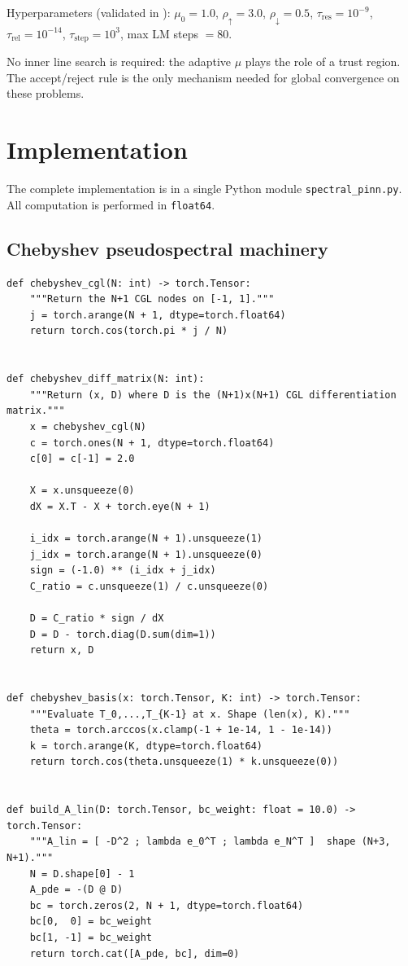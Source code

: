 \documentclass[11pt,a4paper]{article}
\newcommand{\Alin}{A_{\mathrm{lin}}}
\begin{document}
Hyperparameters (validated in ):
$\mu_{0}=1.0$, $\rho_{\uparrow}=3.0$, $\rho_{\downarrow}=0.5$,
$\tau_{\mathrm{res}}=10^{-9}$, $\tau_{\mathrm{rel}}=10^{-14}$,
$\tau_{\mathrm{step}}=10^{3}$, max LM steps $=80$.

No inner line search is required: the adaptive $\mu$ plays the role of a trust
region. The accept/reject rule is the only mechanism needed for global
convergence on these problems.

\section{Implementation}
\label{sec:code}

The complete implementation is in a single Python module \texttt{spectral\_pinn.py}.
All computation is performed in \texttt{float64}.

\subsection{Chebyshev pseudospectral machinery}

\begin{lstlisting}[caption={CGL nodes, differentiation matrix, basis, and $\Alin$.},label={lst:cheb}]
def chebyshev_cgl(N: int) -> torch.Tensor:
    """Return the N+1 CGL nodes on [-1, 1]."""
    j = torch.arange(N + 1, dtype=torch.float64)
    return torch.cos(torch.pi * j / N)


def chebyshev_diff_matrix(N: int):
    """Return (x, D) where D is the (N+1)x(N+1) CGL differentiation matrix."""
    x = chebyshev_cgl(N)
    c = torch.ones(N + 1, dtype=torch.float64)
    c[0] = c[-1] = 2.0

    X = x.unsqueeze(0)
    dX = X.T - X + torch.eye(N + 1)

    i_idx = torch.arange(N + 1).unsqueeze(1)
    j_idx = torch.arange(N + 1).unsqueeze(0)
    sign = (-1.0) ** (i_idx + j_idx)
    C_ratio = c.unsqueeze(1) / c.unsqueeze(0)

    D = C_ratio * sign / dX
    D = D - torch.diag(D.sum(dim=1))
    return x, D


def chebyshev_basis(x: torch.Tensor, K: int) -> torch.Tensor:
    """Evaluate T_0,...,T_{K-1} at x. Shape (len(x), K)."""
    theta = torch.arccos(x.clamp(-1 + 1e-14, 1 - 1e-14))
    k = torch.arange(K, dtype=torch.float64)
    return torch.cos(theta.unsqueeze(1) * k.unsqueeze(0))


def build_A_lin(D: torch.Tensor, bc_weight: float = 10.0) -> torch.Tensor:
    """A_lin = [ -D^2 ; lambda e_0^T ; lambda e_N^T ]  shape (N+3, N+1)."""
    N = D.shape[0] - 1
    A_pde = -(D @ D)
    bc = torch.zeros(2, N + 1, dtype=torch.float64)
    bc[0,  0] = bc_weight
    bc[1, -1] = bc_weight
    return torch.cat([A_pde, bc], dim=0)
\end{lstlisting}
\end{document}
